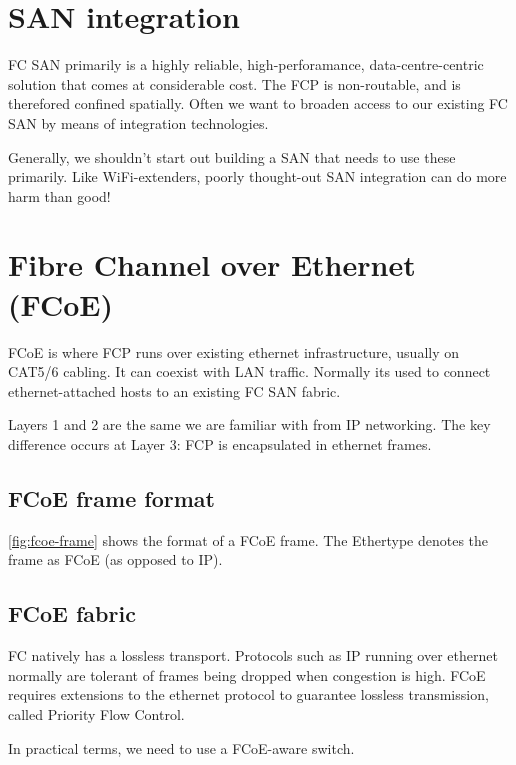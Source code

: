 \section{SAN integration}
\label{sec:san-integration}

FC SAN primarily is a highly reliable, high-perforamance,
data-centre-centric solution that comes at considerable cost. The FCP is
non-routable, and is therefored confined spatially. Often we want to
broaden access to our existing FC SAN by means of integration
technologies.

Generally, we shouldn't start out building a SAN that needs to use these
primarily. Like WiFi-extenders, poorly thought-out SAN integration can
do more harm than good!

\section{Fibre Channel over Ethernet (FCoE)}
\label{sec:fibre-channel-over-ethernet-fcoe}

FCoE is where FCP runs over existing ethernet infrastructure, usually on
CAT5/6 cabling. It can coexist with LAN traffic. Normally its used to
connect ethernet-attached hosts to an existing FC SAN fabric.

Layers 1 and 2 are the same we are familiar with from IP networking. The
key difference occurs at Layer 3: FCP is encapsulated in ethernet
frames.

\subsection{FCoE frame format}
\label{sec:fcoe-frame-format}

\autoref{fig:fcoe-frame} shows the format of a FCoE frame.
The Ethertype denotes the frame as FCoE (as opposed to IP).


\subsection{FCoE fabric}
\label{sec:fcoe-fabric}

FC natively has a lossless transport. Protocols such as IP running over
ethernet normally are tolerant of frames being dropped when congestion
is high. FCoE requires extensions to the ethernet protocol to guarantee
lossless transmission, called Priority Flow Control.

In practical terms, we need to use a FCoE-aware switch.

